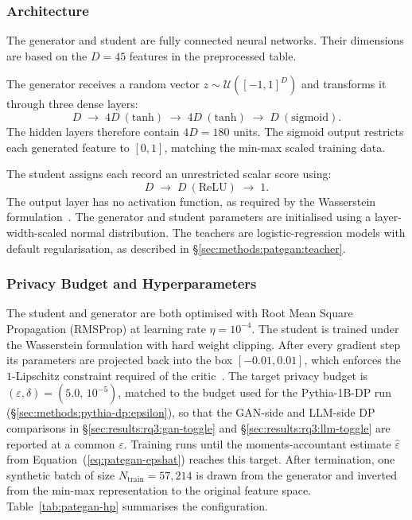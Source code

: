 \subsubsection{Architecture}
\label{sec:methods:pategan:arch}

The generator and student are fully connected neural networks. Their
dimensions are based on the $D=45$ features in the preprocessed table.

The generator receives a random vector
$z \sim \mathcal{U}([-1,1]^D)$ and transforms it through three dense layers:
\begin{equation}
  D \;\to\; 4D~(\mathrm{tanh}) \;\to\; 4D~(\mathrm{tanh})
  \;\to\; D~(\mathrm{sigmoid}).
\end{equation}
The hidden layers therefore contain $4D=180$ units. The sigmoid output
restricts each generated feature to $[0,1]$, matching the min-max scaled
training data.

The student assigns each record an unrestricted scalar score using:
\begin{equation}
  D \;\to\; D~(\mathrm{ReLU}) \;\to\; 1.
\end{equation}
The output layer has no activation function, as required by the Wasserstein
formulation~\cite{Arjovsky2017WGAN}. The generator and student parameters are
initialised using a layer-width-scaled normal distribution. The teachers are
logistic-regression models with default regularisation, as described in
\S\ref{sec:methods:pategan:teacher}.

\subsubsection{Privacy Budget and Hyperparameters}
\label{sec:methods:pategan:hp}

The student and generator are both optimised with 
Root Mean Square Propagation (RMSProp) at learning
rate $\eta = 10^{-4}$. The student is trained under the Wasserstein
formulation with hard weight clipping. After every gradient step its
parameters are projected back into the box $[-0.01, 0.01]$, which
enforces the $1$-Lipschitz constraint required of the
critic~\cite{Arjovsky2017WGAN}. The target privacy budget is
$(\varepsilon, \delta) = (5.0,\,10^{-5})$, matched to the budget used
for the Pythia-1B-DP run (\S\ref{sec:methods:pythia-dp:epsilon}), so that
the GAN-side and LLM-side DP comparisons in
\S\ref{sec:results:rq3:gan-toggle} and \S\ref{sec:results:rq3:llm-toggle}
are reported at a common $\varepsilon$. Training runs until the
moments-accountant estimate $\hat{\varepsilon}$ from
Equation~(\ref{eq:pategan-epshat}) reaches this target. After
termination, one synthetic batch of size $N_{\mathrm{train}} = 57{,}214$
is drawn from the generator and inverted from the min-max
representation to the original feature space. Table~\ref{tab:pategan-hp}
summarises the configuration.

